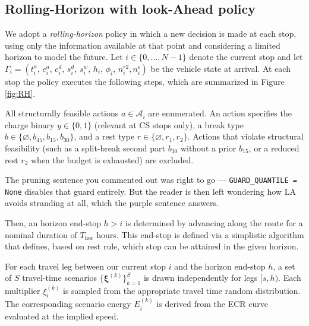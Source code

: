 \subsection{Rolling-Horizon with look-Ahead policy} \label{sec:RHLA}
We adopt a \emph{rolling-horizon} policy in which a new decision is made at each stop, using only the information available at that point and considering a limited horizon to model the future. Let $i \in \{0, \ldots, N-1\}$ denote the current stop and let $\Gamma_i = (t^a_i,\, e^a_i,\, c^d_i,\, s^d_i,\, s^w_i,\, h_i,\, \phi_i,\, n^{r2}_i, n^{\epsilon}_i)$ be the vehicle state at arrival. At each stop the policy executes the following steps, which are summarized in Figure \ref{fig:RH}.

All structurally feasible actions $a \in \mathcal{A}_i$ are enumerated. An action specifies the charge binary $y \in \{0,1\}$ (relevant at CS stops only), a break type $b \in \{\varnothing, b_{45}, b_{15}, b_{30}\}$, and a rest type $r \in \{\varnothing, r_1, r_2\}$. Actions that violate structural feasibility (such as a split-break second part $b_{30}$ without a prior $b_{15}$, or a reduced rest $r_2$ when the budget is exhausted) are excluded. 

\begin{acmt}
The pruning sentence you commented out was right to go ---
\texttt{GUARD\_QUANTILE = None} disables that guard entirely. But the reader is
then left wondering how LA avoids stranding at all, which the purple sentence
answers.
\end{acmt}

Then, an horizon end-stop $h > i$ is determined by advancing along the route for a nominal duration of $T_{\mathrm{hor}}$ hours. This end-stop is defined via a simplistic algorithm that defines, based on rest rule, which stop can be attained in the given horizon.

For each travel leg between our current stop $i$ and the horizon end-stop $h$, a set of $S$ travel-time scenarios $\{ \boldsymbol{\xi}^{(k)}\}_{k=1}^{S}$ is drawn independently for legs $[s, h)$. Each multiplier $\xi^{(k)}_i$ is sampled from the appropriate travel time random distribution. The corresponding scenario energy $E^{(k)}_i$ is derived from the ECR curve evaluated at the implied speed.

